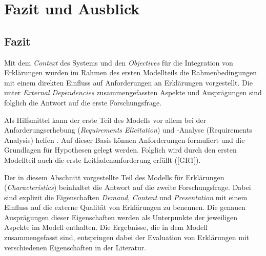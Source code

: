 \chapter{Fazit und Ausblick}

\section{Fazit}

\smallskip

\noindent{}

\smallskip

Mit dem \textit{Context} des Systems und den \textit{Objectives} für die Integration von Erklärungen wurden im Rahmen des ersten Modellteils die Rahmenbedingungen mit einem direkten Einfluss auf Anforderungen an Erklärungen vorgestellt. Die unter \textit{External Dependencies} zusammengefassten Aspekte und Ausprägungen sind folglich die Antwort auf die erste Forschungsfrage.

Als Hilfsmittel kann der erste Teil des Modells vor allem bei der Anforderungserhebung (\textit{Requirements Elicitation}) und -Analyse (Requirements Analysis) helfen \cite{schneider2012abenteuer}. Auf dieser Basis können Anforderungen formuliert und die Grundlagen für Hypothesen gelegt werden. Folglich wird durch den ersten Modellteil auch die erste Leitfadenanforderung erfüllt ([GR1]).

\smallskip

\noindent{}

\smallskip

Der in diesem Abschnitt vorgestellte Teil des Modells für Erklärungen (\textit{Characteristics}) beinhaltet die Antwort auf die zweite Forschungsfrage. Dabei sind explizit die Eigenschaften \textit{Demand}, \textit{Content} und \textit{Presentation} mit einem Einfluss auf die externe Qualität von Erklärungen zu benennen. Die genauen Ausprägungen dieser Eigenschaften werden als Unterpunkte der jeweiligen Aspekte im Modell enthalten. Die Ergebnisse, die in dem Modell zusammengefasst sind, entspringen dabei der Evaluation von Erklärungen mit verschiedenen Eigenschaften in der Literatur.

